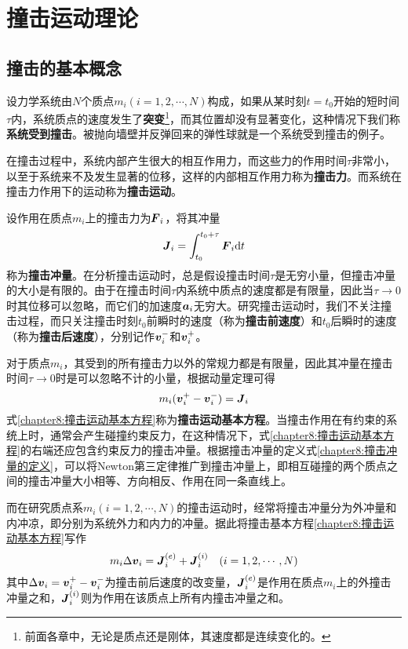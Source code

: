 \chapter{撞击运动理论}

\section{撞击的基本概念}

设力学系统由$N$个质点$m_i(i=1,2,\cdots,N)$构成，如果从某时刻$t=t_0$开始的短时间$\tau$内，系统质点的速度发生了{\bf 突变}\footnote{前面各章中，无论是质点还是刚体，其速度都是连续变化的。}，而其位置却没有显著变化，这种情况下我们称{\bf 系统受到撞击}。被抛向墙壁并反弹回来的弹性球就是一个系统受到撞击的例子。

在撞击过程中，系统内部产生很大的相互作用力，而这些力的作用时间$\tau$非常小，以至于系统来不及发生显著的位移，这样的内部相互作用力称为{\bf 撞击力}。而系统在撞击力作用下的运动称为{\bf 撞击运动}。

设作用在质点$m_i$上的撞击力为$\boldsymbol{F}_i$，将其冲量
\begin{equation}
	\boldsymbol{J}_i = \int_{t_0}^{t_0+\tau}\boldsymbol{F}_i\mathrm{d} t
	\label{chapter8:撞击冲量的定义}
\end{equation}
称为{\bf 撞击冲量}。在分析撞击运动时，总是假设撞击时间$\tau$是无穷小量，但撞击冲量的大小是有限的。由于在撞击时间$\tau$内系统中质点的速度都是有限量，因此当$\tau\to0$时其位移可以忽略，而它们的加速度$\boldsymbol{a}_i$无穷大。研究撞击运动时，我们不关注撞击过程，而只关注撞击时刻$t_0$前瞬时的速度（称为{\bf 撞击前速度}）和$t_0$后瞬时的速度（称为{\bf 撞击后速度}），分别记作$\boldsymbol{v}_i^-$和$\boldsymbol{v}_i^+$。

对于质点$m_i$，其受到的所有撞击力以外的常规力都是有限量，因此其冲量在撞击时间$\tau\to 0$时是可以忽略不计的小量，根据动量定理可得
\begin{equation}
	m_i(\boldsymbol{v}_i^+-\boldsymbol{v}_i^-) = \boldsymbol{J}_i
	\label{chapter8:撞击运动基本方程}
\end{equation}
式\eqref{chapter8:撞击运动基本方程}称为{\bf 撞击运动基本方程}。当撞击作用在有约束的系统上时，通常会产生碰撞约束反力，在这种情况下，式\eqref{chapter8:撞击运动基本方程}的右端还应包含约束反力的撞击冲量。根据撞击冲量的定义式\eqref{chapter8:撞击冲量的定义}，可以将Newton第三定律推广到撞击冲量上，即相互碰撞的两个质点之间的撞击冲量大小相等、方向相反、作用在同一条直线上。

而在研究质点系$m_i(i=1,2,\cdots,N)$的撞击运动时，经常将撞击冲量分为外冲量和内冲凉，即分别为系统外力和内力的冲量。据此将撞击基本方程\eqref{chapter8:撞击运动基本方程}写作
\begin{equation}
	m_i\Delta \boldsymbol{v}_i = \boldsymbol{J}_i^{(e)}+\boldsymbol{J}_i^{(i)}\quad (i=1,2,\cdots,N)
	\label{chapter8:撞击运动基本方程2}
\end{equation}
其中$\Delta \boldsymbol{v}_i = \boldsymbol{v}_i^+-\boldsymbol{v}_i^-$为撞击前后速度的改变量，$\boldsymbol{J}_i^{(e)}$是作用在质点$m_i$上的外撞击冲量之和，$\boldsymbol{J}_i^{(i)}$则为作用在该质点上所有内撞击冲量之和。

